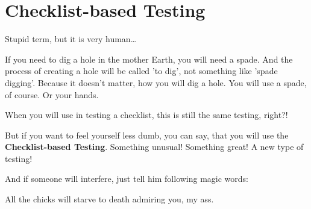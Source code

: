 \section{Checklist-based Testing}
\label{sec:Checklist-based Testing}

Stupid term, but it is very human\ldots

If you need to dig a hole in the mother Earth, you will need a spade. And the process of creating a hole will be called 'to dig', not something like 'spade digging'. Because it doesn't matter, how you will dig a hole. You will use a spade, of course. Or your hands.

When you will use in testing a checklist, this is still the same testing, right?!

But if you want to feel yourself less dumb, you can say, that you will use the \textbf{Checklist-based Testing}. Something unusual! Something great! A new type of testing!

And if someone will interfere, just tell him following magic words: 

All the chicks will starve to death admiring you, my ass.
